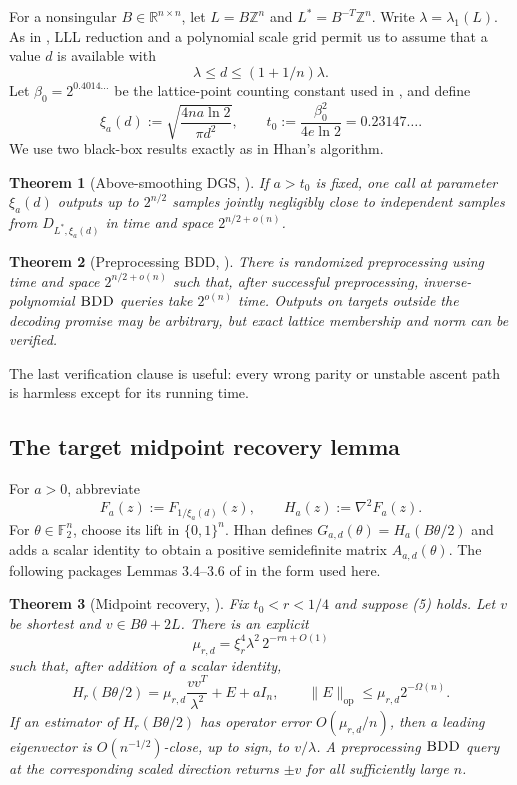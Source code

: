 \documentclass[10pt]{article}
\newtheorem{theorem}{Theorem}[section]
\theoremstyle{definition}
\newcommand{\R}{\mathbb{R}}
\newcommand{\Z}{\mathbb{Z}}
\newcommand{\F}{\mathbb{F}}
\newcommand{\op}{\mathrm{op}}
\newcommand{\BDD}{\textnormal{\textsc{BDD}}}
\newcommand{\norm}[1]{\lVert #1\rVert}
\begin{document}
For a nonsingular $B\in\R^{n\times n}$, let $L=B\Z^n$ and
$L^*=B^{-T}\Z^n$.  Write $\lambda=\lambda_1(L)$.  As in
\cite{Hhan26}, LLL reduction and a polynomial scale grid permit us to assume
that a value $d$ is available with
\[
 \lambda\le d\le(1+1/n)\lambda.                                    \tag{5}
\]
Let $\beta_0=2^{0.4014\ldots}$ be the lattice-point counting constant used in
\cite{Hhan26}, and define
\[
 \xi_a(d):=\sqrt{\frac{4na\ln2}{\pi d^2}},
 \qquad
 t_0:=\frac{\beta_0^2}{4e\ln2}=0.23147\ldots.                       \tag{6}
\]
We use two black-box results exactly as in Hhan's algorithm.

\begin{theorem}[Above-smoothing DGS, \cite{ADRS15,Hhan26}]
If $a>t_0$ is fixed, one call at parameter $\xi_a(d)$ outputs up to
$2^{n/2}$ samples jointly negligibly close to independent samples from
$D_{L^*,\xi_a(d)}$ in time and space $2^{n/2+o(n)}$.
\end{theorem}

\begin{theorem}[Preprocessing BDD, \cite{ACKS25,Hhan26}]
There is randomized preprocessing using time and space $2^{n/2+o(n)}$ such
that, after successful preprocessing, inverse-polynomial $\BDD$ queries take
$2^{o(n)}$ time.  Outputs on targets outside the decoding promise may be
arbitrary, but exact lattice membership and norm can be verified.
\end{theorem}

The last verification clause is useful: every wrong parity or unstable
ascent path is harmless except for its running time.

\subsection{The target midpoint recovery lemma}

For $a>0$, abbreviate
\[
 F_a(z):=F_{1/\xi_a(d)}(z),\qquad H_a(z):=\nabla^2F_a(z).
\]
For $\theta\in\F_2^n$, choose its lift in $\{0,1\}^n$.  Hhan defines
$G_{a,d}(\theta)=H_a(B\theta/2)$ and adds a scalar identity to obtain a
positive semidefinite matrix $A_{a,d}(\theta)$.  The following packages
Lemmas 3.4--3.6 of \cite{Hhan26} in the form used here.

\begin{theorem}[Midpoint recovery, \cite{Hhan26}]                  \label{thm:hhan-endpoint}
Fix $t_0<r<1/4$ and suppose (5) holds.  Let $v$ be shortest and
$v\in B\theta+2L$.  There is an explicit
\[
 \mu_{r,d}=\xi_r^4\lambda^2\,2^{-rn+O(1)}                        \tag{7}
\]
such that, after addition of a scalar identity,
\[
 H_r(B\theta/2)=\mu_{r,d}\frac{vv^T}{\lambda^2}+E+aI_n,
 \qquad \norm E_{\op}\le \mu_{r,d}2^{-\Omega(n)}.                 \tag{8}
\]
If an estimator of $H_r(B\theta/2)$ has operator error
$O(\mu_{r,d}/n)$, then a leading eigenvector is
$O(n^{-1/2})$-close, up to sign, to $v/\lambda$.  A preprocessing $\BDD$
query at the corresponding scaled direction returns $\pm v$ for all
sufficiently large $n$.
\end{theorem}
\end{document}

